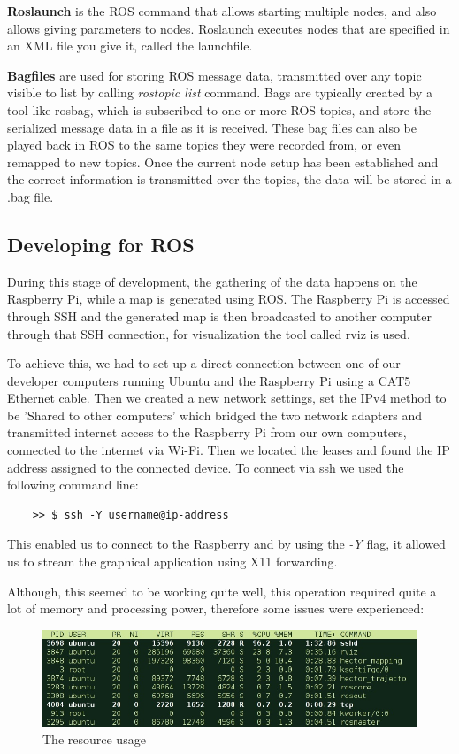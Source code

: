 \textbf{Roslaunch} is the ROS command that allows starting multiple nodes, and also allows giving parameters to nodes. Roslaunch executes nodes that are specified in an XML file you give it, called the launchfile.

\textbf{Bagfiles} are used for storing ROS message data, transmitted over any topic visible to list by calling \textit{rostopic list} command. Bags are typically created by a tool like rosbag, which is subscribed to one or more ROS topics, and store the serialized message data in a file as it is received. These bag files can also be played back in ROS to the same topics they were recorded from, or even remapped to new topics. Once the current node setup has been established and the correct information is transmitted over the topics, the data will be stored in a .bag file.

\subsection{Developing for ROS}
During this stage of development, the gathering of the data happens on the Raspberry Pi, while a map is generated using ROS. The Raspberry Pi is accessed through SSH and the generated map is then broadcasted to another computer through that SSH connection, for visualization the tool called rviz is used. 

To achieve this, we had to set up a direct connection between one of our developer computers running Ubuntu and the Raspberry Pi using a CAT5 Ethernet cable. Then we created a new network settings, set the IPv4 method to be 'Shared to other computers' which bridged the two network adapters and transmitted internet access to the Raspberry Pi from our own computers, connected to the internet via Wi-Fi. Then we located the leases and found the IP address assigned to the connected device. To connect via ssh we used the following command line:
\lstset{language=sh}
\begin{lstlisting}
	>> $ ssh -Y username@ip-address
\end{lstlisting}
This enabled us to connect to the Raspberry and by using the \textit{-Y} flag, it allowed us to stream the graphical application using X11 forwarding.

Although, this seemed to be working quite well, this operation required quite a lot of memory and processing power, therefore some issues were experienced:

\begin{figure}[H]
	\centering
	\includegraphics[width=.8\linewidth]{images/rvisScreenshotCropped.jpg}
	\caption{The resource usage}
\end{figure}


